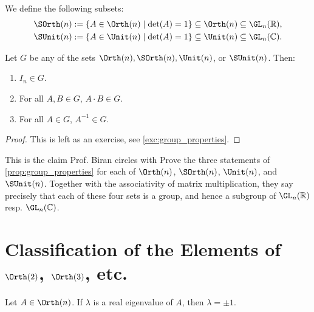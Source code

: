 \begin{definition}
\label{def:special_groups}
We define the following subsets:
\begin{align*}
    \SOrth(n) &:= \{ A \in \Orth(n) \mid \det(A) = 1 \} \subseteq \Orth(n) \subseteq \GL_n(\mathbb{R}), \\
    \SUnit(n) &:= \{ A \in \Unit(n) \mid \det(A) = 1 \} \subseteq \Unit(n) \subseteq \GL_n(\mathbb{C}).
\end{align*}
\end{definition}

\begin{proposition}
\label{prop:group_properties}
Let $G$ be any of the sets $\Orth(n), \SOrth(n), \Unit(n)$, or $\SUnit(n)$. Then:
\begin{enumerate}
    \item $I_n \in G$.
    \item For all $A, B \in G$, $A \cdot B \in G$.
    \item For all $A \in G$, $A^{-1} \in G$.
\end{enumerate}
\end{proposition}

\begin{proof}
This is left as an exercise, see \cref{exc:group_properties}.
\end{proof}

\begin{exercise}
\label{exc:group_properties}
This is the claim Prof. Biran circles with  Prove the three statements of \cref{prop:group_properties} for each of $\Orth(n)$, $\SOrth(n)$, $\Unit(n)$, and $\SUnit(n)$. Together with the associativity of matrix multiplication, they say precisely that each of these four sets is a group, and hence a subgroup of $\GL_n(\mathbb{R})$ resp. $\GL_n(\mathbb{C})$.
\end{exercise}

\section{Classification of the Elements of \texorpdfstring{$\Orth(2)$, $\Orth(3)$}{O(2), O(3)}, etc.}

\begin{lemma}
\label{lem:eigenvalues_orthogonal}
Let $A \in \Orth(n)$. If $\lambda$ is a real eigenvalue of $A$, then $\lambda = \pm 1$.
\end{lemma}

